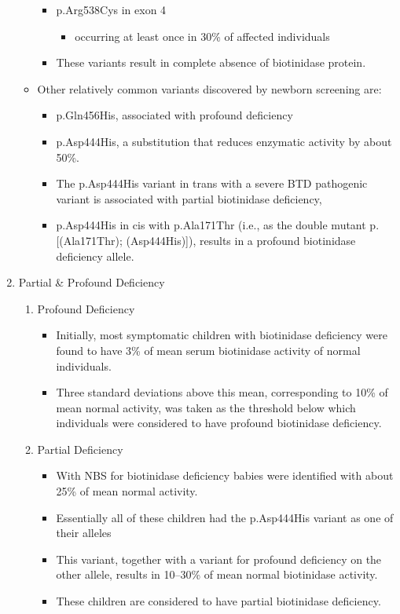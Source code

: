 \documentclass{scrartcl}
\begin{document}
\begin{enumerate}
\begin{itemize}
\begin{itemize}
\item p.Arg538Cys in exon 4
\begin{itemize}
\item occurring at least once in 30\% of affected individuals
\end{itemize}

\item These variants result in complete absence of biotinidase protein.
\end{itemize}

\item Other relatively common variants discovered by newborn screening are:
\begin{itemize}
\item p.Gln456His, associated with profound deficiency

\item p.Asp444His, a substitution that reduces enzymatic activity by about 50\%.

\item The p.Asp444His variant in trans with a severe BTD pathogenic variant is associated with partial biotinidase deficiency,
\item p.Asp444His in cis with p.Ala171Thr (i.e., as the double mutant p.[(Ala171Thr); (Asp444His)]), results in a profound biotinidase deficiency allele.
\end{itemize}
\end{itemize}


\item Partial \& Profound Deficiency
\label{sec:org3255294}

\begin{enumerate}
\item Profound Deficiency
\label{sec:orgc1eaf32}
\begin{itemize}
\item Initially, most symptomatic children with biotinidase deficiency were found to have 3\% of mean serum biotinidase activity of normal individuals.
\item Three standard deviations above this mean, corresponding to 10\% of mean normal activity, was taken as the threshold below which individuals were considered to have profound biotinidase deficiency.
\end{itemize}

\item Partial Deficiency
\label{sec:org5209430}
\begin{itemize}
\item With NBS for biotinidase deficiency babies were identified with about 25\% of mean normal activity.
\item Essentially all of these children had the p.Asp444His variant as one of their alleles
\item This variant, together with a variant for profound deficiency on the other allele, results in 10–30\% of mean normal biotinidase activity.
\item These children are considered to have partial biotinidase deficiency.
\end{itemize}
\end{enumerate}



\end{enumerate}
\end{document}
